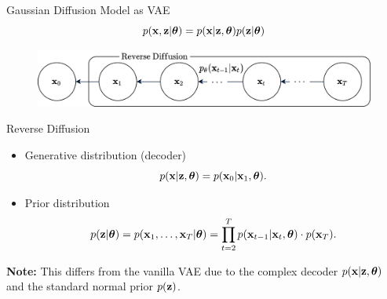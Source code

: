 \documentclass{beamer}
\begin{document}
\begin{frame}{Gaussian Diffusion Model as VAE}
    \[
        p(\mathbf{x}, \mathbf{z} | \boldsymbol{\theta}) = p(\mathbf{x} | \mathbf{z}, \boldsymbol{\theta}) p(\mathbf{z} | \boldsymbol{\theta})
    \]    
    \eqpause
    \vspace{-0.5cm}
    \begin{figure}
        \includegraphics[width=0.8\linewidth]{figs/diffusion_pgm_reverse}
    \end{figure}
    \eqpause
    \vspace{-0.2cm}
    \begin{block}{Reverse Diffusion}
        \begin{itemize}
            \item Generative distribution (decoder)
            \[
                p(\mathbf{x} | \mathbf{z}, \boldsymbol{\theta}) = p(\mathbf{x}_0 | \mathbf{x}_1, \boldsymbol{\theta}).
            \]
            \vspace{-0.7cm}
            \eqpause
            \item Prior distribution
            \vspace{-0.3cm}
            \[
                p(\mathbf{z} | \boldsymbol{\theta}) = p(\mathbf{x}_1, \dots, \mathbf{x}_T | \boldsymbol{\theta}) = \prod_{t=2}^T p(\mathbf{x}_{t - 1} | \mathbf{x}_t, \boldsymbol{\theta})  \cdot p(\mathbf{x}_T).
            \]
            \vspace{-0.3cm}
        \end{itemize}
        \eqpause
        \textbf{Note:} This differs from the vanilla VAE due to the complex decoder $p(\mathbf{x} | \mathbf{z}, \boldsymbol{\theta})$ and the standard normal prior $p(\mathbf{z})$.
    \end{block}
\end{frame}
\end{document}
